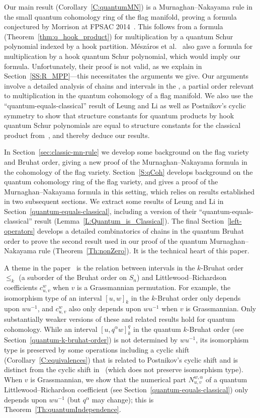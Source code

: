 \documentclass[12pt,oneside,reqno]{amsart}
\theoremstyle{definition}
\numberwithin{equation}{section}
\newcommand{\defcolor}[1]{{\color{RoyalBlue}#1}}
\newcommand{\demph}[1]{\defcolor{{\sl #1}}}
\begin{document}
Our main result (Corollary~\ref{C:quantumMN}) is a Murnaghan--Nakayama rule in the small quantum cohomology
ring of the flag manifold, proving a formula conjectured by Morrison at FPSAC
2014~\cite{Morrison}.
This follows from a  formula (Theorem~\ref{thm:q_hook_product}) for multiplication by a quantum Schur polynomial indexed by
a hook partition. 
M{\'e}sz{\'a}ros et al.~\cite[Thm.~15]{MPP} also gave a formula for multiplication by a hook quantum Schur
polynomial, which would imply our formula.
Unfortunately, their proof is not valid, as we explain in Section~\ref{SS:R_MPP}---this necessitates the arguments we give.
Our arguments involve a detailed analysis of chains and intervals in the \demph{quantum Bruhat order}, a partial order relevant to
multiplication in the quantum cohomology of a flag manifold.
We also use the ``quantum-equals-classical'' result of Leung and Li \cite{LeungLi2012} as well as
Postnikov's cyclic symmetry \cite{Postnikov_symmetry} to show that structure constants for quantum products by hook quantum
Schur 
polynomials are equal to structure constants for the classical product from~\cite{So96}, and thereby deduce our results.

In Section~\ref{sec:classic-mn-rule} we develop some background on the flag variety and Bruhat order, giving a new proof of the
Murnaghan--Nakayama formula in the cohomology of the flag variety.
Section~\ref{S:qCoh} develops background on the quantum cohomology ring of the flag variety, and gives a proof of the 
Murnaghan--Nakayama formula in this setting, which relies on results established in two subsequent
sections.
We extract some results of Leung and Li \cite{LeungLi2012} in Section~\ref{quantum-equals-classical}, including a version
of their  ``quantum-equals-classical'' result (Lemma~\ref{L:Quantum_is_Classical}).
The final Section~\ref{left-operators} develops a detailed combinatorics of chains in the quantum Bruhat order to prove the second
result used in our proof of the quantum Murnaghan--Nakayama rule (Theorem~\ref{Th:nonZero}).
It is the technical heart of this paper.

A theme in the paper~\cite{BS-Bruhat} is the relation between intervals in the $k$-Bruhat order $\leq_k$ (a suborder of the Bruhat order on
$S_n$) and Littlewood--Richardson coefficients $c^w_{u,v}$ when $v$ is a Grassmannian permutation.
For example, the isomorphism type of an interval $[u,w]_k$ in the $k$-Bruhat order only depends upon $wu^{-1}$, and $c^w_{u,v}$ also only
depends upon $wu^{-1}$ when $v$ is Grassmannian.
Only substantially weaker versions of these and related results hold for quantum cohomology.
While an interval $[u,q^\alpha w]_k^q$ in the quantum $k$-Bruhat order (see Section~\ref{quantum-k-bruhat-order}) is not determined by
$wu^{-1}$, its isomorphism type is preserved by some operations including a cyclic shift (Corollary~\ref{C:equivalences}) that is related to
Postnikov's cyclic shift and is distinct from the cyclic shift in~\cite{BS-Bruhat} (which does not preserve isomorphism type).
When $v$ is Grassmannian, we show that the numerical part $N^{w,\alpha}_{u,v}$ of a quantum Littlewood--Richardson coefficient (see
Section~\ref{quantum-equals-classical}) only depends upon $wu^{-1}$ (but $q^\alpha$ may change); this is
Theorem~\ref{Th:quantumIndependence}.
\end{document}
